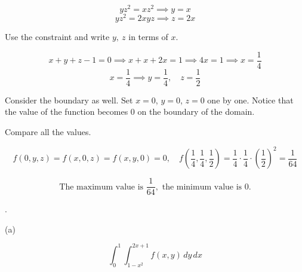 \documentclass{article}
\begin{document}
\[yz^2=xz^2\implies y=x\]
\[yz^2=2xyz\implies z=2x\]

\hfill

\noindent Use the constraint and write $y,\:z$ in terms of $x$.

\[x+y+z-1=0\implies x+x+2x=1\implies 4x=1\implies x=\frac14\]
\[x=\frac14\implies y=\frac14,\quad z=\frac12\]

\hfill

\noindent Consider the boundary as well. Set $x=0$, $y=0$, $z=0$ one by one. Notice that the value of the function becomes $0$ on the boundary of the domain.

\hfill

\noindent Compare all the values.

\[f(0,y,z)=f(x,0,z)=f(x,y,0)=0,\quad f\left(\frac14,\frac14,\frac12\right)=\frac14\cdot\frac14\cdot\left(\frac12\right)^2=\frac1{64}\]

\[\boxed{\text{The maximum value is }\frac1{64},\text{ the minimum value is }0.}\]

\hfill

.

\hfill

\noindent (a)
\begin{center}
\begin{minipage}{0.45\textwidth}
\end{minipage}
\begin{minipage}{0.4\textwidth}
\[\boxed{\int_0^1\int_{1-x^2}^{2x+1}f(x,y)\,dy\,dx}\]
\end{minipage}
\end{center}
\end{document}
